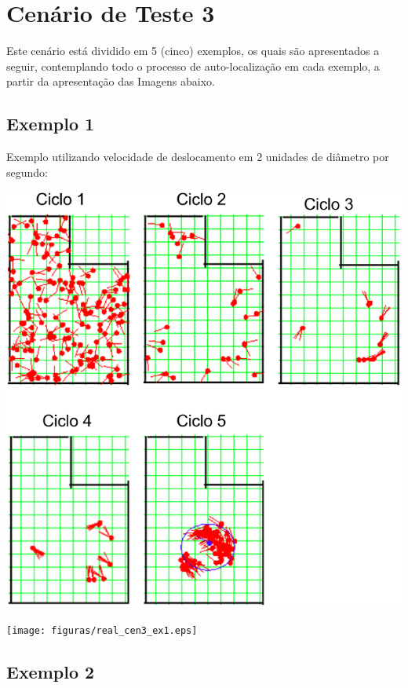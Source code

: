 \section{Cenário de Teste 3}

Este cenário está dividido em 5 (cinco) exemplos, os quais são apresentados a seguir, contemplando todo o processo de auto-localização
em cada exemplo, a partir da apresentação das Imagens abaixo.

\subsection{Exemplo 1}

Exemplo utilizando velocidade de deslocamento em 2 unidades de diâmetro por segundo:

{\centering
\includegraphics[scale=0.4]{figuras/cen3_ex1.eps}
\label{img:cen3_ex1}
\par}

{\centering
\texttt{[image: figuras/real\_cen3\_ex1.eps]}
\label{img:real_cen3_ex1}
\par}


\subsection{Exemplo 2}

